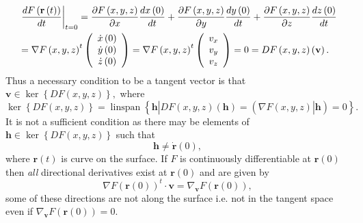 \documentclass[aps,preprint]{revtex4}%
\begin{document}
\begin{align}
&  \left.  \frac{dF\left(  \mathbf{r}\left(  t\right)  \right)  }%
{dt}\right\vert _{t=0}=\frac{\partial F\left(  x,y,z\right)  }{\partial
x}\frac{dx\left(  0\right)  }{dt}+\frac{\partial F\left(  x,y,z\right)
}{\partial y}\frac{dy\left(  0\right)  }{dt}+\frac{\partial F\left(
x,y,z\right)  }{\partial z}\frac{dz\left(  0\right)  }{dt}\nonumber\\
&  =\nabla F\left(  x,y,z\right)  ^{t}\left(
\begin{array}
[c]{c}%
\dot{x}\left(  0\right) \\
\dot{y}\left(  0\right) \\
\dot{z}\left(  0\right)
\end{array}
\right)  =\nabla F\left(  x,y,z\right)  ^{t}\left(
\begin{array}
[c]{c}%
v_{x}\\
v_{y}\\
v_{z}%
\end{array}
\right)  =0=DF\left(  x,y,z\right)  \left(  \mathbf{v}\right)  .
\end{align}
Thus a necessary condition to be a tangent vector is that $\mathbf{v\in}%
\ker\left\{  DF\left(  x,y,z\right)  \right\}  ,$ where
\begin{equation}
\ker\left\{  DF\left(  x,y,z\right)  \right\}  =\operatorname{linspan}\left\{
\left.  \overset{}{\mathbf{h}}\right\vert DF\left(  x,y,z\right)  \left(
\mathbf{h}\right)  =\left(  \left.  \overset{}{\nabla F\left(  x,y,z\right)
}\right\vert \mathbf{h}\right)  =0\right\}  .
\end{equation}
It is not a sufficient condition as there may be elements of $\mathbf{h\in
}\ker\left\{  DF\left(  x,y,z\right)  \right\}  $ such that
\begin{equation}
\mathbf{h\neq\dot{r}}\left(  0\right)  ,
\end{equation}
where $\mathbf{r}\left(  t\right)  $ is curve on the surface. If $F$ is
continuously differentiable at $\mathbf{r}\left(  0\right)  $ then \emph{all
}directional derivatives exist at $\mathbf{r}\left(  0\right)  $ and are given
by
\begin{equation}
\nabla F\left(  \mathbf{r}\left(  0\right)  \right)  ^{t}\cdot\mathbf{v}%
=\nabla_{\mathbf{v}}F\left(  \mathbf{r}\left(  0\right)  \right)  ,
\end{equation}
some of these directions are not along the surface i.e. not in the tangent
space even if $\nabla_{\mathbf{v}}F\left(  \mathbf{r}\left(  0\right)
\right)  =0$.
\end{document}
